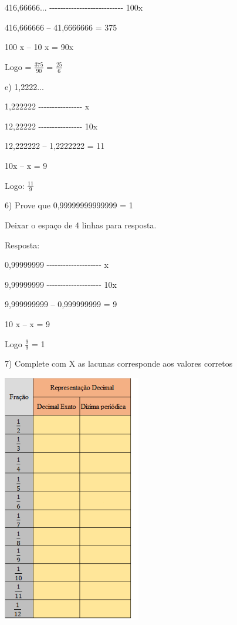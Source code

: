 416,66666...
-\/-\/-\/-\/-\/-\/-\/-\/-\/-\/-\/-\/-\/-\/-\/-\/-\/-\/-\/-\/-\/-\/-\/-\/-\/-\/-
100x

416,666666 -- 41,6666666 = 375

100 x -- 10 x = 90x

Logo = \(\frac{375}{90}\) = \(\frac{25}{6}\)

e) 1,2222...

1,222222 -\/-\/-\/-\/-\/-\/-\/-\/-\/-\/-\/-\/-\/-\/-\/- x

12,22222 -\/-\/-\/-\/-\/-\/-\/-\/-\/-\/-\/-\/-\/-\/-\/- 10x

12,222222 -- 1,2222222 = 11

10x -- x = 9

Logo: \(\frac{11}{9}\)

6) Prove que 0,99999999999999 = 1

Deixar o espaço de 4 linhas para resposta.

Resposta:

0,99999999 -\/-\/-\/-\/-\/-\/-\/-\/-\/-\/-\/-\/-\/-\/-\/-\/-\/-\/-\/- x

9,99999999 -\/-\/-\/-\/-\/-\/-\/-\/-\/-\/-\/-\/-\/-\/-\/-\/-\/-\/-\/-
10x

9,999999999 -- 0,999999999 = 9

10 x -- x = 9

Logo \(\frac{9}{9}\) = 1

7) Complete com X as lacunas corresponde aos valores corretos

\includegraphics[width=2.37378in,height=4.29167in]{./imgSAEB_8_MAT/media/image3.png}

